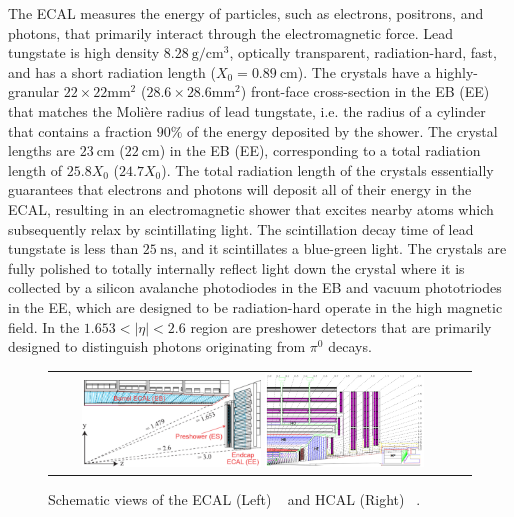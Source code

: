 The ECAL measures the energy of particles, such as electrons, positrons, and photons, that primarily interact through the electromagnetic force.
Lead tungstate is high density $\SI{8.28}{\g\per\cm\cubed}$, optically transparent, radiation-hard, fast, and has a short radiation length ($X_0 = \SI{0.89}{\cm}$).
The crystals have a highly-granular $22 \times 22 \si{\mm\squared}$ ($28.6 \times 28.6 \si{\mm\squared}$) front-face cross-section in the EB (EE) that matches the Molière radius of lead tungstate, i.e. the radius of a cylinder that contains a fraction $90 \%$ of the energy deposited by the shower.
The crystal lengths are $\SI{23}{\cm}$ ($\SI{22}{\cm}$) in the EB (EE), corresponding to a total radiation length of $25.8X_0$ ($24.7X_0$).
The total radiation length of the crystals essentially guarantees that electrons and photons will deposit all of their energy in the ECAL, resulting in an electromagnetic shower that excites nearby atoms which subsequently relax by scintillating light.
The scintillation decay time of lead tungstate is less than $\SI{25}{\ns}$, and it scintillates a blue-green light.
The crystals are fully polished to totally internally reflect light down the crystal where it is collected by a silicon avalanche photodiodes in the EB and vacuum phototriodes in the EE, which are designed to be radiation-hard operate in the high magnetic field.
In the $1.653 < \vert \eta \vert < 2.6$ region are preshower detectors that are primarily designed to distinguish photons originating from $\pi^0$ decays.

\begin{figure}[!htb]
  \begin{center}
    \begin{tabular}{cc}
        \includegraphics[width=0.45\textwidth]{fig_LHC_CMS/ECAL.pdf}
        \includegraphics[width=0.40\textwidth]{fig_LHC_CMS/HCAL.png}
    \end{tabular}
    \caption{Schematic views of the ECAL (Left) ~\cite{Bayatian:922757} and HCAL (Right) ~\cite{Chatrchyan:1129810}.
            }
    \label{ECAL_HCAL}
  \end{center}
\end{figure}

